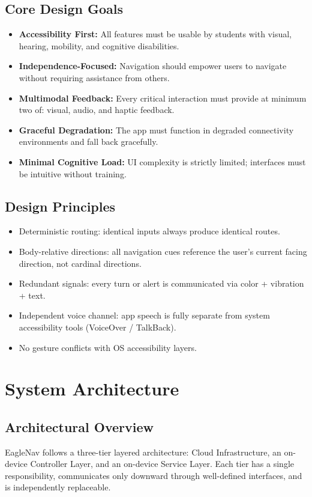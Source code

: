 \documentclass[12pt]{article}
\begin{document}
\subsection{Core Design Goals}
\begin{itemize}
    \item \textbf{Accessibility First:} All features must be usable by students with visual, hearing, mobility, and cognitive disabilities.
    \item \textbf{Independence-Focused:} Navigation should empower users to navigate without requiring assistance from others.
    \item \textbf{Multimodal Feedback:} Every critical interaction must provide at minimum two of: visual, audio, and haptic feedback.
    \item \textbf{Graceful Degradation:} The app must function in degraded connectivity environments and fall back gracefully.
    \item \textbf{Minimal Cognitive Load:} UI complexity is strictly limited; interfaces must be intuitive without training.
\end{itemize}

\subsection{Design Principles}
\begin{itemize}
    \item Deterministic routing: identical inputs always produce identical routes.
    \item Body-relative directions: all navigation cues reference the user's current facing direction, not cardinal directions.
    \item Redundant signals: every turn or alert is communicated via color + vibration + text.
    \item Independent voice channel: app speech is fully separate from system accessibility tools (VoiceOver / TalkBack).
    \item No gesture conflicts with OS accessibility layers.
\end{itemize}

\section{System Architecture}

\subsection{Architectural Overview}
EagleNav follows a three-tier layered architecture: Cloud Infrastructure, an on-device Controller Layer, and an on-device Service Layer. Each tier has a single responsibility, communicates only downward through well-defined interfaces, and is independently replaceable.
\end{document}
